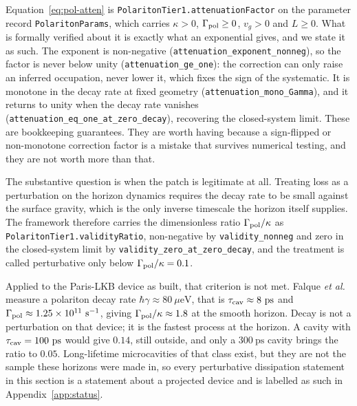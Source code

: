 \documentclass[aps,prd,reprint,nofootinbib,superscriptaddress]{revtex4-2}
\begin{document}
Equation~\eqref{eq:pol-atten} is
\texttt{PolaritonTier1.attenuationFactor} on the parameter record
\texttt{PolaritonParams}, which carries $\kappa > 0$,
$\Gamma_{\rm pol} \geq 0$, $v_g > 0$ and $L \geq 0$. What is formally
verified about it is exactly what an exponential gives, and we state it
as such. The exponent is non-negative
(\texttt{attenuation\_exponent\_nonneg}), so the factor is never below
unity (\texttt{attenuation\_ge\_one}): the correction can only raise an
inferred occupation, never lower it, which fixes the sign of the
systematic. It is monotone in the decay rate at fixed geometry
(\texttt{attenuation\_mono\_Gamma}), and it returns to unity when the
decay rate vanishes (\texttt{attenuation\_eq\_one\_at\_zero\_decay}),
recovering the closed-system limit. These are bookkeeping guarantees.
They are worth having because a sign-flipped or non-monotone correction
factor is a mistake that survives numerical testing, and they are not
worth more than that.

The substantive question is when the patch is legitimate at all.
Treating loss as a perturbation on the horizon dynamics requires the
decay rate to be small against the surface gravity, which is the only
inverse timescale the horizon itself supplies. The framework therefore
carries the dimensionless ratio $\Gamma_{\rm pol}/\kappa$ as
\texttt{PolaritonTier1.validityRatio}, non-negative by
\texttt{validity\_nonneg} and zero in the closed-system limit by
\texttt{validity\_zero\_at\_zero\_decay}, and the treatment is called
perturbative only below $\Gamma_{\rm pol}/\kappa = 0.1$.

Applied to the Paris-LKB device as built, that criterion is not met.
Falque \emph{et al.} measure a polariton decay rate
$\hbar\gamma \approx 80~\mu\mathrm{eV}$, that is
$\tau_{\rm cav} \approx 8~\mathrm{ps}$ and
$\Gamma_{\rm pol} \approx 1.25\times10^{11}~\mathrm{s}^{-1}$, giving
$\Gamma_{\rm pol}/\kappa \approx 1.8$ at the smooth horizon. Decay is
not a perturbation on that device; it is the fastest process at the
horizon. A cavity with $\tau_{\rm cav} = 100~\mathrm{ps}$ would give
$0.14$, still outside, and only a $300~\mathrm{ps}$ cavity brings the
ratio to $0.05$. Long-lifetime microcavities of that class exist, but
they are not the sample these horizons were made in, so every
perturbative dissipation statement in this section is a statement about
a projected device and is labelled as such in
Appendix~\ref{app:status}.
\end{document}
